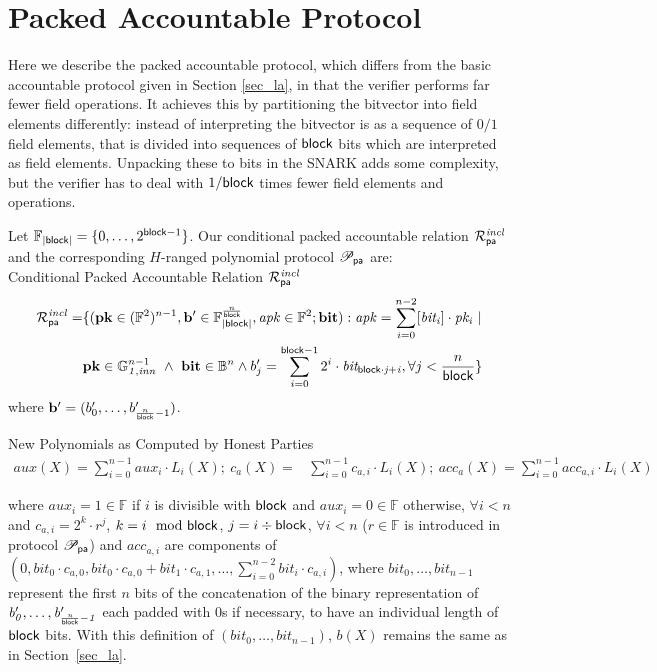 \section{Packed Accountable Protocol}
\label{sec_a}

Here we describe the packed accountable protocol, which differs from the basic accountable protocol given in Section \ref{sec_la}, in that the verifier performs far fewer field operations. It achieves this by partitioning the bitvector into field elements differently:  instead of interpreting the bitvector is as a sequence of $0/1$ field elements, that is divided into sequences of $\mathsf{block}$ bits which are interpreted as field elements. Unpacking these to bits in the SNARK adds some complexity, but the verifier has to deal with $1/\mathsf{block}$ times fewer field elements and operations.


Let $\mathbb{F}_{|\mathsf{block}|} = \{0, \ldots, 2^{\mathsf{block} -1} \}$. %
Our conditional packed accountable relation $\mathcal{R}^{\mathit{incl}}_{\mathsf{pa}}$ and the corresponding $H$-ranged polynomial protocol 
$\mathscr{P}_{\mathsf{pa}}$ are:\\
 
\noindent \textsf{Conditional Packed Accountable Relation $\mathcal{R}^{\mathit{incl}}_{\mathsf{pa}}$} 
\begin{equation*}
\begin{split}
\mathcal{R}^{\mathit{incl}}_{\mathsf{pa}} = & \{(\mathbf{pk} \in (\mathbb{F}^2)^{n-1},\mathbf{b'} \in \mathbb{F}_{|\mathsf{block}|}^{\frac{n}{\mathsf{block}}},
\mathit{apk} \in \mathbb{F}^2; \mathbf{bit}) : \mathit{apk} = \sum_{i=0}^{n-2} [\mathit{bit_i}] \cdot \mathit{pk_i} \ | \\ 
& \mathbf{pk} \in \mathbb{G}_{\mathit{1,inn}}^{n-1} \ \wedge \ \mathbf{bit} \in \mathbb{B}^n  \wedge b'_{j} = \sum_{i=0}^{\mathsf{block} -1}2^i \cdot \mathit{bit_{\mathsf{block} \cdot j + i}}, \forall j < \frac{n}{\mathsf{block}} \} 
\end{split}
\end{equation*}
where $\mathbf{b'} = (b'_{0}, \ldots, b'_{{\frac{n}{\mathsf{block}}} -1})$.

\noindent \textsf{New Polynomials as Computed by Honest Parties} 
\begin{align*}
aux(X) =  \sum_{i=0}^{n-1}aux_i \cdot L_i(X); \ c_{a}(X) = & \sum_{i=0}^{n-1} c_{a,i} \cdot L_i(X); \ acc_{a}(X)  =   \sum_{i=0}^{n-1} acc_{a,i}  \cdot L_i(X)
\end{align*}

\noindent where $aux_{i} = 1 \in \mathbb{F}$ if $i$ is divisible with $\mathsf{block}$ and $aux_{i} = 0 \in \mathbb{F}$ otherwise, $\forall i < n$ 
and $c_{a,i} = 2^k \cdot r^j$, $k = i \mod {\mathsf{block}}$, $j = i \div \mathsf{block}$, $\forall i < n$ ($r \in \mathbb{F}$ is introduced in protocol $\mathscr{P}_{\mathsf{pa}}$) and $acc_{a,i}$ are components of $(0, \mathit{bit}_0 \cdot c_{a,0}, \mathit{bit}_0 \cdot c_{a,0}+ \mathit{bit}_1  \cdot c_{a,1}, \ldots, \sum_{i=0}^{n-2}\mathit{bit}_i \cdot c_{a,i})$, where $\mathit{bit_{0}}, \ldots, \mathit{bit_{n-1}}$ represent the first $n$ 
bits of the concatenation of the binary representation of 
$\mathit{b'_{0}}, \ldots, \mathit{b'_{\frac{n}{\mathsf{block}}-1}}$ each 
padded  with 0s  if necessary, to have an individual length of $\mathsf{block}$ bits. With this definition of $(\mathit{bit_{0}}, \ldots, \mathit{bit_{n-1}})$, $b(X)$ remains the same as in Section~\ref{sec_la}.\\

